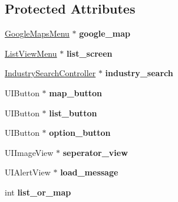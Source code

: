 \subsection*{\-Protected \-Attributes}
\begin{DoxyCompactItemize}
\item 
\hypertarget{interface_menu_a9939fcca0037c0a92dae8abe63ea8a7c}{
\hyperlink{interface_google_maps_menu}{\-Google\-Maps\-Menu} $\ast$ {\bfseries google\-\_\-map}}
\label{interface_menu_a9939fcca0037c0a92dae8abe63ea8a7c}

\item 
\hypertarget{interface_menu_a488f981918694e279f7be8d556cc8341}{
\hyperlink{interface_list_view_menu}{\-List\-View\-Menu} $\ast$ {\bfseries list\-\_\-screen}}
\label{interface_menu_a488f981918694e279f7be8d556cc8341}

\item 
\hypertarget{interface_menu_ac82e42c9391f593e0249981e938f18e2}{
\hyperlink{interface_industry_search_controller}{\-Industry\-Search\-Controller} $\ast$ {\bfseries industry\-\_\-search}}
\label{interface_menu_ac82e42c9391f593e0249981e938f18e2}

\item 
\hypertarget{interface_menu_a4137aad201ddadf230beb5a3132c1468}{
\-U\-I\-Button $\ast$ {\bfseries map\-\_\-button}}
\label{interface_menu_a4137aad201ddadf230beb5a3132c1468}

\item 
\hypertarget{interface_menu_a9d6d1f27a7f9d012f0cdde5e5a9574d6}{
\-U\-I\-Button $\ast$ {\bfseries list\-\_\-button}}
\label{interface_menu_a9d6d1f27a7f9d012f0cdde5e5a9574d6}

\item 
\hypertarget{interface_menu_aa1087396b85fed769411aaf7ffc616c5}{
\-U\-I\-Button $\ast$ {\bfseries option\-\_\-button}}
\label{interface_menu_aa1087396b85fed769411aaf7ffc616c5}

\item 
\hypertarget{interface_menu_aa3946db0d29b0111c63d74108b72d57f}{
\-U\-I\-Image\-View $\ast$ {\bfseries seperator\-\_\-view}}
\label{interface_menu_aa3946db0d29b0111c63d74108b72d57f}

\item 
\hypertarget{interface_menu_a6f7d408428be7c2ff710717102c0df58}{
\-U\-I\-Alert\-View $\ast$ {\bfseries load\-\_\-message}}
\label{interface_menu_a6f7d408428be7c2ff710717102c0df58}

\item 
\hypertarget{interface_menu_a75eeb299743dee6f3259d28816196e28}{
int {\bfseries list\-\_\-or\-\_\-map}}
\label{interface_menu_a75eeb299743dee6f3259d28816196e28}


\end{DoxyCompactItemize}
